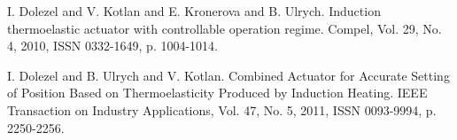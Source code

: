 
\begin{thebibliography}{10}

{\sc I. Dolezel and V. Kotlan and E. Kronerova and B. Ulrych}. {Induction thermoelastic actuator with controllable operation regime}. Compel, Vol. 29, No. 4, 2010, ISSN 0332-1649, p. 1004-1014.



{\sc I. Dolezel and B. Ulrych and V. Kotlan}. {Combined Actuator for Accurate Setting of Position Based on Thermoelasticity Produced by Induction Heating}. IEEE Transaction on Industry Applications, Vol. 47, No. 5, 2011, ISSN 0093-9994, p. 2250-2256.

\end{thebibliography}
